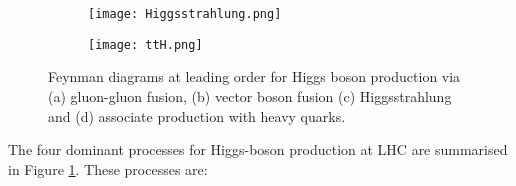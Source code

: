 \begin{figure}[H]
  \vspace{1cm}
  
  \begin{subfigure}[b]{0.45\textwidth}
    \centering
    \texttt{[image: Higgsstrahlung.png]}
    
    \caption{}
  \end{subfigure}
  \begin{subfigure}[b]{0.45\textwidth}
    \centering
    \texttt{[image: ttH.png]}
    
    \caption{}
  \end{subfigure}

  \caption{Feynman diagrams at leading order for Higgs boson production via (a) gluon-gluon fusion, (b) vector boson fusion (c) Higgsstrahlung and (d) associate production with heavy quarks.}
  \label{fig:Higgs_production_feynman diagrams}
\end{figure}
\indent The four dominant processes for Higgs-boson production at LHC are summarised in Figure \ref{fig:Higgs_production_feynman diagrams}. These processes are:

